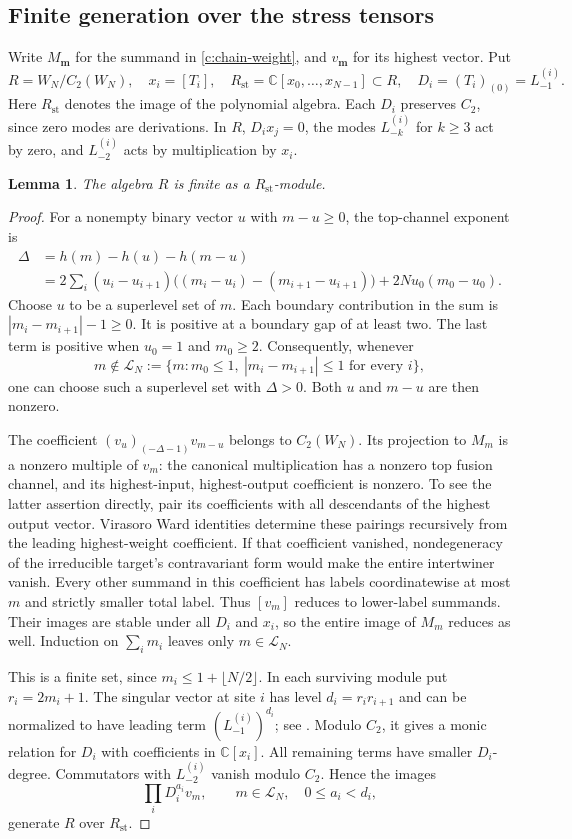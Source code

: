 \documentclass[11pt,a4paper]{article}
\numberwithin{equation}{section}
\newtheorem{lemma}[theorem]{Lemma}
\theoremstyle{definition}\newtheorem{definition}[theorem]{Definition}
\theoremstyle{remark}\newtheorem{remark}[theorem]{Remark}
\newcommand{\C}{\mathbb C}\newcommand{\Z}{\mathbb Z}\newcommand{\Q}{\mathbb Q}
\begin{document}
\subsection*{Finite generation over the stress tensors}
Write $M_{\mathbf m}$ for the summand in \eqref{c:chain-weight}, and $v_{\mathbf m}$ for its highest vector. Put
\[
 R=W_N/C_2(W_N),\quad x_i=[T_i],\quad
 R_{\mathrm{st}}=\C[x_0,\ldots,x_{N-1}]\subset R,\quad D_i=(T_i)_{(0)}=L^{(i)}_{-1}.
\]
Here $R_{\mathrm{st}}$ denotes the image of the polynomial algebra. Each $D_i$ preserves $C_2$, since zero modes are derivations. In $R$, $D_i x_j=0$, the modes $L^{(i)}_{-k}$ for $k\ge3$ act by zero, and $L^{(i)}_{-2}$ acts by multiplication by $x_i$.

\begin{lemma}\label{c:stress-finite}
The algebra $R$ is finite as a $R_{\mathrm{st}}$-module.
\end{lemma}
\begin{proof}
For a nonempty binary vector $u$ with $m-u\ge0$, the top-channel exponent is
\begin{align*}
 \Delta&=h(m)-h(u)-h(m-u)\\
 &=2\sum_i(u_i-u_{i+1})\big((m_i-u_i)-(m_{i+1}-u_{i+1})\big)
       +2Nu_0(m_0-u_0).
\end{align*}
Choose $u$ to be a superlevel set of $m$. Each boundary contribution in the sum is $|m_i-m_{i+1}|-1\ge0$. It is positive at a boundary gap of at least two. The last term is positive when $u_0=1$ and $m_0\ge2$. Consequently, whenever
\[
 m\notin\mathcal L_N:=\{m:m_0\le1,\ |m_i-m_{i+1}|\le1\text{ for every }i\},
\]
one can choose such a superlevel set with $\Delta>0$. Both $u$ and $m-u$ are then nonzero.

The coefficient $(v_u)_{(-\Delta-1)}v_{m-u}$ belongs to $C_2(W_N)$. Its projection to $M_m$ is a nonzero multiple of $v_m$: the canonical multiplication has a nonzero top fusion channel, and its highest-input, highest-output coefficient is nonzero. To see the latter assertion directly, pair its coefficients with all descendants of the highest output vector. Virasoro Ward identities determine these pairings recursively from the leading highest-weight coefficient. If that coefficient vanished, nondegeneracy of the irreducible target's contravariant form would make the entire intertwiner vanish. Every other summand in this coefficient has labels coordinatewise at most $m$ and strictly smaller total label. Thus $[v_m]$ reduces to lower-label summands. Their images are stable under all $D_i$ and $x_i$, so the entire image of $M_m$ reduces as well. Induction on $\sum_i m_i$ leaves only $m\in\mathcal L_N$.

This is a finite set, since $m_i\le1+\lfloor N/2\rfloor$. In each surviving module put $r_i=2m_i+1$. The singular vector at site $i$ has level $d_i=r_i r_{i+1}$ and can be normalized to have leading term $(L^{(i)}_{-1})^{d_i}$; see \cite[Proposition 2.2.2]{virasoro}. Modulo $C_2$, it gives a monic relation for $D_i$ with coefficients in $\C[x_i]$. All remaining terms have smaller $D_i$-degree. Commutators with $L^{(i)}_{-2}$ vanish modulo $C_2$. Hence the images
\[
 \prod_i D_i^{a_i}v_m,\qquad m\in\mathcal L_N,\quad 0\le a_i<d_i,
\]
generate $R$ over $R_{\mathrm{st}}$.
\end{proof}
\end{document}
